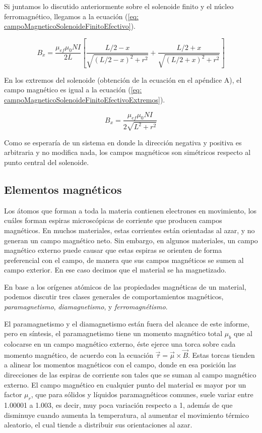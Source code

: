 \documentclass[a4paper,12pt]{article}
\begin{document}
        Si juntamos lo discutido anteriormente sobre el solenoide finito y el núcleo ferromagnético, llegamos a la ecuación (\ref{eq: campoMagneticoSolenoideFinitoEfectivo}).

        \begin{equation}
            \label{eq: campoMagneticoSolenoideFinitoEfectivo}
            B_x = \frac{\mu_{ef}\mu_0 N I}{2L} \left[ \frac{L/2 - x}{\sqrt{(L/2 - x)^2 + r^2}} + \frac{L/2 + x}{\sqrt{(L/2 + x)^2 + r^2}} \right]
        \end{equation}

        En los extremos del solenoide (obtención de la ecuación en el apéndice A), el campo magnético es igual a la ecuación (\ref{eq: campoMagneticoSolenoideFinitoEfectivoExtremos}).

        \begin{equation}
            \label{eq: campoMagneticoSolenoideFinitoEfectivoExtremos}
            B_x = \frac{\mu_{ef}\mu_0 N I}{2\sqrt{L^2 + r^2}}
        \end{equation}

        Como se esperaría de un sistema en donde la dirección negativa y positiva es arbitraria y no modifica nada, los campos magnéticos son simétricos respecto al punto central del solenoide.

    \subsection*{Elementos magnéticos}

        Los átomos que forman a toda la materia contienen electrones en movimiento, los cuáles forman espiras microscópicas de corriente que producen campos magnéticos. En muchos materiales, estas corrientes están orientadas al azar, y no generan un campo magnético neto. Sin embargo, en algunos materiales, un campo magnético externo puede causar que estas espiras se orienten de forma preferencial con el campo, de manera que sus campos magnéticos se sumen al campo exterior. En ese caso decimos que el material se ha magnetizado. 

        En base a los orígenes atómicos de las propiedades magnéticas de un material, podemos discutir tres clases generales de comportamientos magnéticos, \emph{paramagnetismo}, \emph{diamagnetismo}, y \emph{ferromagnétismo}. 

        El paramagnetismo y el diamagnetismo están fuera del alcance de este informe, pero en síntesis, el paramagnetismo tiene un momento magnético total $\mu_b$ que al colocarse en un campo magnético externo, éste ejerce una torca sobre cada momento magnético, de acuerdo con la ecuación $\vec{\tau} = \vec{\mu} \times \vec{B}$. Estas torcas tienden a alinear los momentos magnéticos con el campo, donde en esa posición las direcciones de las espiras de corriente son tales que se suman al campo magnético externo. El campo magnético en cualquier punto del material es mayor por un factor $\mu_r$, que para sólidos y líquidos paramagnéticos comunes, suele variar entre 1.00001 a 1.003, es decir, muy poca variación respecto a 1, además de que disminuye cuando aumenta la temperatura, al aumentar el movimiento térmico aleatorio, el cual tiende a distribuir sus orientaciones al azar.
\end{document}
